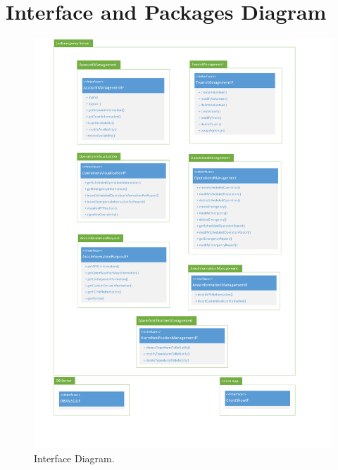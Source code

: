 \section{Interface and Packages Diagram}

\begin{figure}[h!]
	\centering
	\includegraphics[width=0.8\linewidth]{./Iterazione 1/OtherFiles/UML - Interface diagram}
	\caption{Interface Diagram.}
	\label{fig:InterfaceDiagram}
\end{figure}